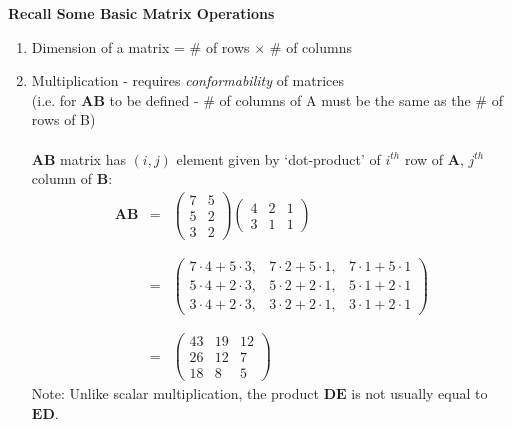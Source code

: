 \newpage

\textbf{Recall Some Basic Matrix Operations}
\begin{enumerate}
\item Dimension of a matrix = \# of rows $\times$ \# of columns

\item Multiplication - requires {\em conformability} of matrices\\
(i.e. for \textbf{AB} to be defined - \# of columns of A must be the same as the \# of rows of B)\\~\\
\textbf{AB} matrix has $(i,j)$ element given by `dot-product' of $i^{th}$ row of $\textbf{A}$, $j^{th}$ column of $\textbf{B}$:
\[ 
\begin{array}{ccc}
\textbf{AB} & = & 
\left(\begin{array}{cc} 7 & 5 \\ 5 & 2 \\ 3 & 2 \end{array}\right)  
\left(\begin{array}{ccc} 4 & 2 & 1 \\ 3 & 1 & 1 \end{array}\right)  
\\
& & \\
& & \\
& = & \left(\begin{array}{ccc} 
7 \cdot 4 + 5 \cdot 3, & 
7 \cdot 2 + 5 \cdot 1, & 
7 \cdot 1 + 5 \cdot 1 \\
5 \cdot 4 + 2 \cdot 3, & 
5 \cdot 2 + 2 \cdot 1, & 
5 \cdot 1 + 2 \cdot 1 \\
3 \cdot 4 + 2 \cdot 3, & 
3 \cdot 2 + 2 \cdot 1, & 
3 \cdot 1 + 2 \cdot 1 \end{array}\right) \\
& & \\
& & \\
& = & \left(\begin{array}{ccc} 43 & 19 & 12 \\ 26 & 12 & 7 \\ 18 & 8 & 5 \end{array}\right) \end{array}
\] 
Note: Unlike scalar multiplication, the product $\textbf{DE}$ is not usually equal to $\textbf{ED}$. \\~\\~\\


\end{enumerate}
